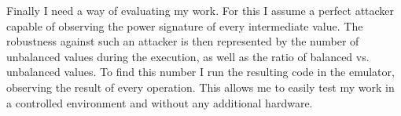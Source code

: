 Finally I need a way of evaluating my work.
For this I assume a perfect attacker capable of observing the power signature of every intermediate value.
The robustness against such an attacker is then represented by the number of unbalanced values during the execution, as well as the ratio of balanced vs. unbalanced values.
To find this number I run the resulting code in the \qemu{} emulator, observing the result of every operation.
This allows me to easily test my work in a controlled environment and without any additional hardware.
